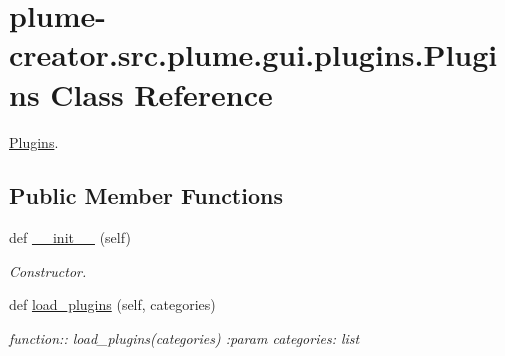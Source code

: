 \hypertarget{classplume-creator_1_1src_1_1plume_1_1gui_1_1plugins_1_1_plugins}{}\section{plume-\/creator.src.\+plume.\+gui.\+plugins.\+Plugins Class Reference}
\label{classplume-creator_1_1src_1_1plume_1_1gui_1_1plugins_1_1_plugins}


\hyperlink{classplume-creator_1_1src_1_1plume_1_1gui_1_1plugins_1_1_plugins}{Plugins}.  


\subsection*{Public Member Functions}
\begin{DoxyCompactItemize}
\item 
def \hyperlink{classplume-creator_1_1src_1_1plume_1_1gui_1_1plugins_1_1_plugins_abda903a8d383460f7ad3f72a409e82c6}{\+\_\+\+\_\+init\+\_\+\+\_\+} (self)\hypertarget{classplume-creator_1_1src_1_1plume_1_1gui_1_1plugins_1_1_plugins_abda903a8d383460f7ad3f72a409e82c6}{}\label{classplume-creator_1_1src_1_1plume_1_1gui_1_1plugins_1_1_plugins_abda903a8d383460f7ad3f72a409e82c6}

\begin{DoxyCompactList}\small\item\em Constructor. \end{DoxyCompactList}\item 
def \hyperlink{classplume-creator_1_1src_1_1plume_1_1gui_1_1plugins_1_1_plugins_ad5a166af35438a11fb8b9e05f32cf409}{load\+\_\+plugins} (self, categories)\hypertarget{classplume-creator_1_1src_1_1plume_1_1gui_1_1plugins_1_1_plugins_ad5a166af35438a11fb8b9e05f32cf409}{}\label{classplume-creator_1_1src_1_1plume_1_1gui_1_1plugins_1_1_plugins_ad5a166af35438a11fb8b9e05f32cf409}

\begin{DoxyCompactList}\small\item\em function\+:\+: load\+\_\+plugins(categories) \+:param categories\+: list \end{DoxyCompactList}\end{DoxyCompactItemize}
